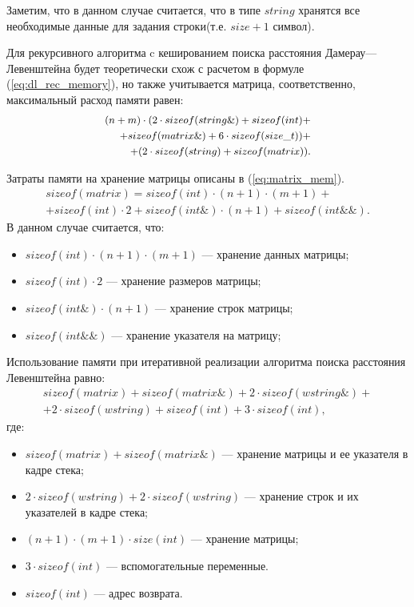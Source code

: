 Заметим, что в данном случае считается, что в типе $string$ хранятся все необходимые данные для задания строки(т.е. $size + 1$ символ).

Для рекурсивного алгоритма c кешированием поиска расстояния Дамерау---Левенштейна будет теоретически схож с расчетом в формуле (\ref{eq:dl_rec_memory}),
но также учитывается матрица, соответственно, максимальный расход памяти равен:
\begin{equation}
	\label{eq:dl_hash_memory}
    \small
	\begin{aligned}
		(n + m) \cdot (2 \cdot sizeof(string\&) + sizeof(int)+\\ +sizeof(matrix\&) + 6 \cdot sizeof(size\_t))+ \\
        + (2 \cdot sizeof(string) + sizeof(matrix)).
	\end{aligned}
\end{equation}

Затраты памяти на хранение матрицы описаны в  (\ref{eq:matrix_mem}).
\begin{equation}
	\label{eq:matrix_mem}
    \begin{aligned}
	sizeof(matrix) = sizeof(int) \cdot (n+1) \cdot (m + 1)+  \\
    + sizeof(int) \cdot 2 + sizeof(int\&) \cdot (n + 1) + sizeof(int\&\&).
    \end{aligned}
\end{equation}
В данном случае считается, что:
\begin{itemize}
	\item $sizeof(int) \cdot (n+1) \cdot (m + 1)$ --- хранение данных матрицы;
	\item $sizeof(int) \cdot 2$ --- хранение размеров матрицы;
	\item $sizeof(int\&) \cdot (n + 1)$ --- хранение строк матрицы;
	\item $sizeof(int\&\&)$ --- хранение указателя на матрицу;
\end{itemize}


Использование памяти при итеративной реализации алгоритма поиска расстояния Левенштейна  равно:
\begin{equation}
	\label{eq:lev_mtr_memory}
	\begin{aligned}
		sizeof(matrix) + sizeof(matrix\&) + 2 \cdot sizeof(wstring\&)+\\
        + 2 \cdot sizeof(wstring) + sizeof(int) + 3 \cdot sizeof(int),
	\end{aligned}
\end{equation}
где:
\begin{itemize}
	\item $sizeof(matrix) + sizeof(matrix\&)$ --- хранение матрицы и ее указателя в кадре стека;
	\item $2 \cdot sizeof(wstring) + 2 \cdot sizeof(wstring)$ --- хранение строк и их указателей в кадре стека;
	\item $(n + 1) \cdot (m + 1) \cdot size(int)$ --- хранение матрицы;
	\item $3 \cdot sizeof(int)$ --- вспомогательные переменные.
	\item $sizeof(int)$ --- адрес возврата.
\end{itemize}

